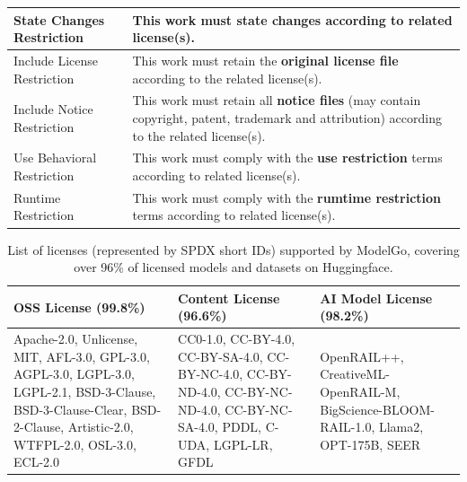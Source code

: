 \begin{table}[t]
\begin{tabular}{|p{3.3cm}|p{4.3cm}|}
    State Changes Restriction & This work must \textbf{state changes} according to related license(s). \\ \hline
    Include License Restriction & This work must retain the \textbf{original license file} according to the related license(s). \\ \hline
    Include Notice Restriction & This work must retain all \textbf{notice files} (may contain copyright, patent, trademark and attribution) according to the related license(s). \\ \hline
    Use Behavioral Restriction & This work must comply with the \textbf{use restriction} terms according to related license(s). \\ \hline
    Runtime Restriction & This work must comply with the \textbf{rumtime restriction} terms according to related license(s). \\ \hline

    \end{tabular}
    \vspace{-2mm}
\end{table}

\begin{table}[t]
    \caption{List of licenses (represented by SPDX short IDs) supported by ModelGo, covering over 96\% of licensed models and datasets on Huggingface.}
    \vspace{-3mm}
    \scriptsize
    \label{tab:list}
    \begin{tabular}{|p{2.45cm}|p{2.45cm}|p{2.45cm}|}
    \hline
    \rowcolor[gray]{.8}
    \textbf{OSS License} (99.8\%) & \textbf{Content License} (96.6\%) & \textbf{AI Model License} (98.2\%)\\ \hline
    Apache-2.0, Unlicense, MIT, AFL-3.0, GPL-3.0, AGPL-3.0, LGPL-3.0, LGPL-2.1, BSD-3-Clause, BSD-3-Clause-Clear, BSD-2-Clause, Artistic-2.0, WTFPL-2.0, OSL-3.0, ECL-2.0
    &
    CC0-1.0, CC-BY-4.0, CC-BY-SA-4.0, CC-BY-NC-4.0, CC-BY-ND-4.0, CC-BY-NC-ND-4.0, CC-BY-NC-SA-4.0, PDDL, C-UDA, LGPL-LR, GFDL
    & 
    OpenRAIL++, CreativeML-OpenRAIL-M, BigScience-BLOOM-RAIL-1.0, Llama2, OPT-175B, SEER
    \\ \hline

    \end{tabular}
    \vspace{-2mm}
\end{table}


